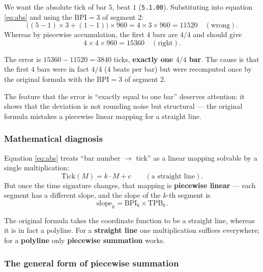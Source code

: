 \documentclass[11pt,a4paper]{article}
\begin{document}
We want the absolute tick of bar $5$, beat $1$ (\texttt{5.1.00}). Substituting into
equation \eqref{eq:abs} and using the $\mathrm{BPI}=3$ of segment 2:
\[
\bigl((5-1)\times 3 + (1-1)\bigr)\times 960 = 4\times 3\times 960 = 11520 \quad(\text{wrong}).
\]
Whereas by piecewise accumulation, the first $4$ bars are $4/4$ and should give
\[
4\times 4\times 960 = 15360 \quad(\text{right}).
\]

\begin{observation}
The error is $15360-11520 = 3840$ ticks, \textbf{exactly one $4/4$ bar}.
The cause is that the first $4$ bars were in fact $4/4$ ($4$ beats per bar) but were
recomputed once by the original formula with the $\mathrm{BPI}=3$ of segment 2.
\end{observation}

The feature that the error is ``exactly equal to one bar'' deserves attention: it shows
that the deviation is not rounding noise but structural --- the original formula
mistakes a piecewise linear mapping for a straight line.

\subsubsection{Mathematical diagnosis}

Equation \eqref{eq:abs} treats ``bar number $\to$ tick'' as a linear mapping solvable by
a single multiplication:
\begin{equation}
  \mathrm{Tick}(M) = k\cdot M + c \qquad(\text{a straight line}).
\end{equation}
But once the time signature changes, that mapping is \textbf{piecewise linear} --- each
segment has a different slope, and the slope of the $k$-th segment is
\begin{equation}
  \label{eq:slope}
  \text{slope}_k = \mathrm{BPI}_k \times \mathrm{TPB}_k .
\end{equation}

\begin{observation}
The original formula takes the coordinate function to be a straight line, whereas it is
in fact a polyline. For a \textbf{straight line} one multiplication suffices
everywhere; for a \textbf{polyline} only \textbf{piecewise summation} works.
\end{observation}

\subsubsection{The general form of piecewise summation}
\end{document}
